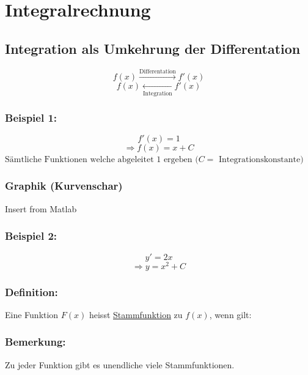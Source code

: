 \documentclass[11pt]{amsart}
\theoremstyle{remark}
\begin{document}
\section{Integralrechnung}
\subsection{Integration als Umkehrung der Differentation}
\begin{equation*}
	f(x)\xrightarrow{\text{Differentation}} f'(x)
\end{equation*}
\begin{equation*}
	f(x)\xleftarrow[\text{Integration}]{} f'(x)
\end{equation*}
\subsubsection*{Beispiel 1:}
\begin{equation*}
	f'(x) = 1
\end{equation*}
\begin{equation*}
	\Rightarrow f(x) = x + C 
\end{equation*}	
	$\text{S\"amtliche Funktionen welche abgeleitet 1 ergeben ($C=$ Integrationskonstante)}$
\subsubsection*{Graphik (Kurvenschar)} Insert from Matlab 
\subsubsection*{Beispiel 2:}
\begin{equation*}
	y' = 2x
\end{equation*}
\begin{equation*}
	\Rightarrow y = x^2 + C
\end{equation*}
\subsubsection*{Definition:}
Eine Funktion $F(x)$ heisst \underline{Stammfunktion} zu $f(x)$, wenn gilt:
\subsubsection*{Bemerkung:}
Zu jeder Funktion gibt es unendliche viele Stammfunktionen.
\end{document}
